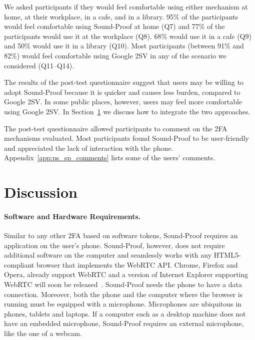 We asked participants if they would feel comfortable using either mechanism at home, at their workplace, in a cafe, and in a library.
95\% of the participants would feel comfortable using Sound-Proof at home (Q7) and 77\% of the participants would use it at the workplace (Q8).
68\% would use it in a cafe (Q9) and 50\% would use it in a library (Q10).
Most participants (between 91\% and 82\%) would feel comfortable using Google 2SV in any of the scenario we considered (Q11--Q14).

The results of the post-test questionnaire suggest that users may be willing to adopt Sound-Proof because it is quicker and causes less burden, compared to Google 2SV.
In some public places, however, users may feel more comfortable using Google 2SV. In Section~\ref{sec:ps_sp_discussion} we discuss how to integrate the two approaches.

The post-test questionnaire allowed participants to comment on the 2FA mechanisms evaluated.
Most participants found Sound-Proof to be user-friendly and appreciated the lack of interaction with the phone.
Appendix~\ref{app:ps_sp_comments} lists some of the users' comments.

\section{Discussion}
\label{sec:ps_sp_discussion}




\paragraph{Software and Hardware Requirements.}
Similar to any other 2FA based on software tokens, Sound-Proof requires an application on the user's phone.
Sound-Proof, however, does not require additional software on the computer and seamlessly works with any
HTML5-compliant browser that implements the WebRTC API.
Chrome, Firefox and Opera, already support WebRTC and a version of Internet Explorer supporting WebRTC will soon be released~\cite{iewebrtc}.
Sound-Proof needs the phone to have a data connection. Moreover, both the phone and the computer where the browser is running must be equipped with a microphone. Microphones are ubiquitous in phones, tablets and laptops. If a computer such as a desktop machine does not have an embedded microphone, Sound-Proof requires an external microphone, like the one of a webcam.

